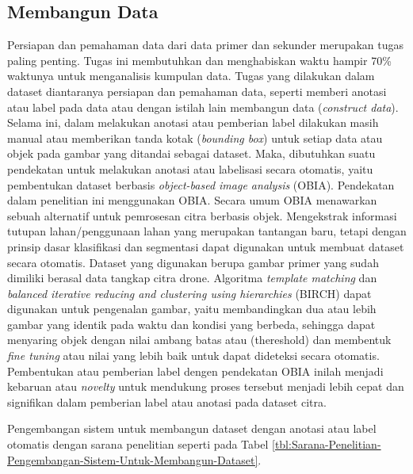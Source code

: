 \subsection{Membangun Data}
\hspace{1,2cm}Persiapan dan pemahaman data dari data primer dan sekunder merupakan tugas paling penting. Tugas ini membutuhkan dan menghabiskan waktu hampir 70\% waktunya untuk menganalisis kumpulan data. Tugas yang dilakukan dalam dataset diantaranya persiapan dan pemahaman data, seperti memberi anotasi atau label pada data atau dengan istilah lain membangun data (\textit{construct data}). Selama ini, dalam melakukan anotasi atau pemberian label dilakukan masih manual atau memberikan tanda kotak (\textit{bounding box}) untuk setiap data atau objek pada gambar yang ditandai sebagai dataset. Maka, dibutuhkan suatu pendekatan untuk melakukan anotasi atau labelisasi secara otomatis, yaitu pembentukan dataset berbasis \textit{object-based image analysis} (OBIA). Pendekatan dalam penelitian ini menggunakan OBIA. Secara umum OBIA menawarkan sebuah alternatif untuk pemrosesan citra berbasis objek. Mengekstrak informasi tutupan lahan/penggunaan lahan yang merupakan tantangan baru, tetapi dengan prinsip dasar klasifikasi dan segmentasi dapat digunakan untuk membuat dataset secara otomatis. Dataset yang digunakan berupa gambar primer yang sudah dimiliki berasal data tangkap citra drone. Algoritma \textit{template matching} dan \textit{balanced iterative reducing and clustering using hierarchies} (BIRCH) dapat digunakan untuk pengenalan gambar, yaitu membandingkan dua atau lebih gambar yang identik pada waktu dan kondisi yang berbeda, sehingga dapat menyaring objek dengan nilai ambang batas atau (thereshold) dan membentuk \textit{fine tuning} atau nilai yang lebih baik untuk dapat dideteksi secara otomatis. Pembentukan atau pemberian label dengen pendekatan OBIA inilah menjadi kebaruan atau \textit{novelty} untuk mendukung proses tersebut menjadi lebih cepat dan signifikan dalam pemberian label atau anotasi pada dataset citra.

Pengembangan sistem untuk membangun dataset dengan anotasi atau label otomatis dengan sarana penelitian seperti pada Tabel \ref{tbl:Sarana-Penelitian-Pengembangan-Sistem-Untuk-Membangun-Dataset}.

